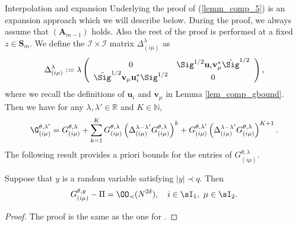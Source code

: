 \begin{subsection}{Interpolation and expansion}
Underlying the proof of (\ref{lemm_comp_5}) is an expansion approach which we will describe below. 
During the proof, we always assume that $(\mathbf A_{m-1})$ holds. Also the rest of the proof is performed at a fixed $z\in \mathbf S_m$. We define the $\mathcal I \times \mathcal I$ matrix $\Delta_{(i\mu)}^\lambda$ as
\begin{equation}\label{deltaimu}
\Delta_{(i\mu)}^{\lambda} :=\lambda \left( {\begin{array}{*{20}c}
   { 0 } & \Sig^{1/2} \mathbf u_i \mathbf v_\mu^* \tilde \Sig^{1/2}   \\
   { \tilde \Sig^{1/2}\mathbf v_\mu \mathbf u_i^* \Sig^{1/2} } & {0}  \\
   \end{array}} \right),%
\end{equation}
where we recall the definitions of $\mathbf u_i$ and $\mathbf v_\mu$ in Lemma \ref{lem_comp_gbound}. Then we have for any $\lambda,\lambda'\in \mathbb R$ and $K\in \mathbb N$,
\begin{equation}\label{eq_comp_expansion}
\G_{(i \mu)}^{\theta,\lambda'} = G_{(i\mu)}^{\theta,\lambda}+\sum_{k=1}^{K}  G_{(i\mu)}^{\theta,\lambda}\left( \Delta_{(i\mu)}^{\lambda-\lambda'} G_{(i\mu)}^{\theta,\lambda}\right)^k+ G_{(i\mu)}^{\theta,\lambda'}\left(\Delta_{(i\mu)}^{\lambda-\lambda'} G_{(i\mu)}^{\theta,\lambda}\right)^{K+1}.
\end{equation}
The following result provides a priori bounds for the entries of $G_{(i\mu)}^{\theta,\lambda}$.
\begin{lemma}\label{lemm_comp_6}
 Suppose that $y$ is a random variable satisfying $|y|\prec q$. Then
 \begin{equation}\label{comp_eq_apriori}
   G_{(i\mu)}^{\theta,y}-\Pi=\OO_{\prec}(N^{2\delta}),\quad i\in\sI_1, \ \mu\in\sI_2.
 \end{equation}
\end{lemma}
\begin{proof} The proof is the same as the one for \cite[Lemma 7.14]{Anisotropic}. \end{proof}

\end{subsection}
